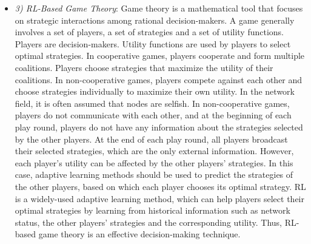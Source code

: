 \begin{itemize}
\item[]\textit{3)	RL-Based Game Theory}: Game theory is a mathematical tool that focuses on strategic interactions among rational decision-makers. A game generally involves a set of players, a set of strategies and a set of utility functions. Players are decision-makers. Utility functions are used by players to select optimal strategies. In cooperative games, players cooperate and form multiple coalitions. Players choose strategies that maximize the utility of their coalitions. In non-cooperative games, players compete against each other and choose strategies individually to maximize their own utility. In the network field, it is often assumed that nodes are selfish.
In non-cooperative games, players do not communicate with each other, and at the beginning of each play round, players do not have any information about the strategies selected by the other players. At the end of each play round, all players broadcast their selected strategies, which are the only external information. However, each player’s utility can be affected by the other players’ strategies. In this case, adaptive learning methods should be used to predict the strategies of the other players, based on which each player chooses its optimal strategy. RL is a widely-used adaptive learning method, which can help players select their optimal strategies by learning from historical information such as network status, the other players’ strategies and the corresponding utility. Thus, RL-based game theory is an effective decision-making technique.
\end{itemize}

